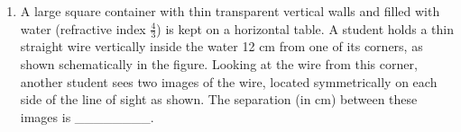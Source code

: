 
\begin{enumerate}
    \item A large square container with thin transparent vertical walls and filled with water (refractive index $\frac{4}{3}$) is kept on a horizontal table. A student holds a thin straight wire vertically inside the water 12 cm from one of its corners, as shown schematically in the figure. Looking at the wire from this corner, another student sees two images of the wire, located symmetrically on each side of the line of sight as shown. The separation (in cm) between these images is \_\_\_\_\_\_\_\_.
    \begin{center}
    \end{center}
\end{enumerate}
